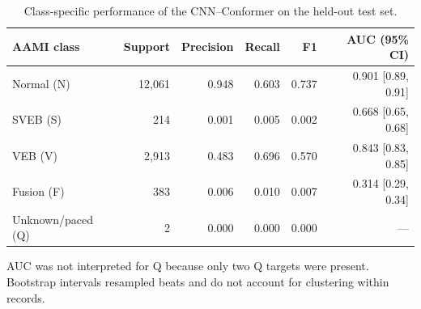 \begin{table}[t]
  \centering
  \caption{Class-specific performance of the CNN--Conformer on the held-out test set.}
  \label{tab:class-metrics}
  \begin{tabular}{lrrrrr}
    \toprule
    AAMI class & Support & Precision & Recall & F1 & AUC (95\% CI) \\
    \midrule
    Normal (N) & 12{,}061 & 0.948 & 0.603 & 0.737 & 0.901 [0.89, 0.91] \\
    SVEB (S) & 214 & 0.001 & 0.005 & 0.002 & 0.668 [0.65, 0.68] \\
    VEB (V) & 2{,}913 & 0.483 & 0.696 & 0.570 & 0.843 [0.83, 0.85] \\
    Fusion (F) & 383 & 0.006 & 0.010 & 0.007 & 0.314 [0.29, 0.34] \\
    Unknown/paced (Q) & 2 & 0.000 & 0.000 & 0.000 & --- \\
    \bottomrule
  \end{tabular}
  \begin{minipage}{0.94\textwidth}
    \footnotesize AUC was not interpreted for Q because only two Q targets were present. Bootstrap intervals resampled beats and do not account for clustering within records.
  \end{minipage}
\end{table}
